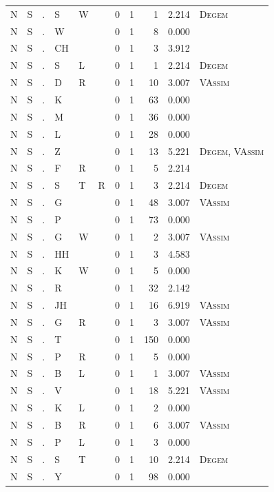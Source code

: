 \documentclass[12pt]{article}
\begin{document}
\begin{longtable}{r@{ } r@{ } c@{ } l@{ } l@{ } l@{ } r r r r l }
N & S & . & S & W &  & 0 & 1 & 1 & 2.214 & \textsc{Degem} \\
N & S & . & W &  &  & 0 & 1 & 8 & 0.000 &  \\
N & S & . & CH &  &  & 0 & 1 & 3 & 3.912 &  \\
N & S & . & S & L &  & 0 & 1 & 1 & 2.214 & \textsc{Degem} \\
N & S & . & D & R &  & 0 & 1 & 10 & 3.007 & \textsc{VAssim} \\
N & S & . & K &  &  & 0 & 1 & 63 & 0.000 &  \\
N & S & . & M &  &  & 0 & 1 & 36 & 0.000 &  \\
N & S & . & L &  &  & 0 & 1 & 28 & 0.000 &  \\
N & S & . & Z &  &  & 0 & 1 & 13 & 5.221 & \textsc{Degem}, \textsc{VAssim} \\
N & S & . & F & R &  & 0 & 1 & 5 & 2.214 &  \\
N & S & . & S & T & R & 0 & 1 & 3 & 2.214 & \textsc{Degem} \\
N & S & . & G &  &  & 0 & 1 & 48 & 3.007 & \textsc{VAssim} \\
N & S & . & P &  &  & 0 & 1 & 73 & 0.000 &  \\
N & S & . & G & W &  & 0 & 1 & 2 & 3.007 & \textsc{VAssim} \\
N & S & . & HH &  &  & 0 & 1 & 3 & 4.583 &  \\
N & S & . & K & W &  & 0 & 1 & 5 & 0.000 &  \\
N & S & . & R &  &  & 0 & 1 & 32 & 2.142 &  \\
N & S & . & JH &  &  & 0 & 1 & 16 & 6.919 & \textsc{VAssim} \\
N & S & . & G & R &  & 0 & 1 & 3 & 3.007 & \textsc{VAssim} \\
N & S & . & T &  &  & 0 & 1 & 150 & 0.000 &  \\
N & S & . & P & R &  & 0 & 1 & 5 & 0.000 &  \\
N & S & . & B & L &  & 0 & 1 & 1 & 3.007 & \textsc{VAssim} \\
N & S & . & V &  &  & 0 & 1 & 18 & 5.221 & \textsc{VAssim} \\
N & S & . & K & L &  & 0 & 1 & 2 & 0.000 &  \\
N & S & . & B & R &  & 0 & 1 & 6 & 3.007 & \textsc{VAssim} \\
N & S & . & P & L &  & 0 & 1 & 3 & 0.000 &  \\
N & S & . & S & T &  & 0 & 1 & 10 & 2.214 & \textsc{Degem} \\
N & S & . & Y &  &  & 0 & 1 & 98 & 0.000 &  \\

\end{longtable}
\end{document}
